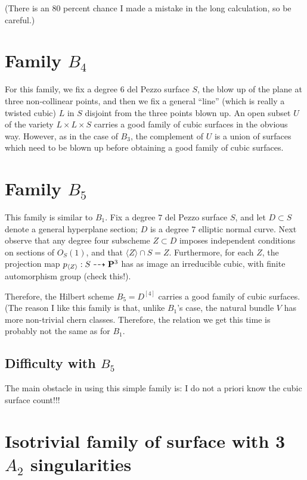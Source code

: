 \documentclass[12pt,reqno]{amsart}
\numberwithin{equation}{section}
\begin{document}
(There is an 80 percent chance I made a mistake in the long
calculation, so be careful.)

\section{Family $B_4$}
\label{sec:family-b_4}

For this family, we fix a degree $6$ del Pezzo surface $S$, the blow
up of the plane at three non-collinear points, and then we fix a
general ``line'' (which is really a twisted cubic) $L$ in $S$ disjoint
from the three points blown up.  An open subset $U$ of the variety
$L \times L \times S$ carries a good family of cubic surfaces in the
obvious way. However, as in the case of $B_3$, the complement of $U$
is a union of surfaces which need to be blown up before obtaining a
good family of cubic surfaces.


\section{Family $B_5$}
\label{sec:family-b_5-1}

This family is similar to $B_1$. Fix a degree $7$ del Pezzo surface
$S$, and let $D \subset S$ denote a general hyperplane section; $D$ is
a degree $7$ elliptic normal curve.  Next observe that any degree four
subscheme $Z \subset D$ imposes independent conditions on sections of
$O_{S}(1)$, and that $\langle Z \rangle \cap S = Z$.  Furthermore, for
each $Z$, the projection map
$p_{\langle Z \rangle}: S \dashrightarrow \P^{3}$ has as image an
irreducible cubic, with finite automorphism group (check this!).


Therefore, the Hilbert scheme $B_{5} = D^{[4]}$ carries a good family
of cubic surfaces.  (The reason I like this family is that, unlike
$B_1$'s case, the natural bundle $V$ has more non-trivial chern
classes. Therefore, the relation we get this time is probably not the
same as for $B_1$.

\subsection{Difficulty with $B_5$}
\label{sec:difficulty-with-b_5}

The main obstacle in using this simple family is: I do not a priori
know the cubic surface count!!!
\section{Isotrivial family of surface with 3 $A_2$ singularities}
\label{sec:isotrivial3A2}
\end{document}
